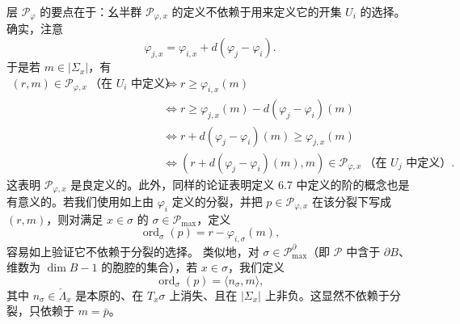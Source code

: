 层 $\mathcal{P}_\varphi$ 的要点在于：幺半群 $\mathcal{P}_{\varphi,x}$ 的定义不依赖于用来定义它的开集 $U_i$ 的选择。确实，注意
\[
\varphi_{j,x}=\varphi_{i,x}+d(\varphi_j-\varphi_i).
\]
于是若 $m\in|\Sigma_x|$，有
\begin{align*}
(r,m)\in\mathcal{P}_{\varphi,x}\ \text{（在 }U_i\text{ 中定义）}
&\iff r\ge\varphi_{i,x}(m)\\
&\iff r\ge\varphi_{j,x}(m)-d(\varphi_j-\varphi_i)(m)\\
&\iff r+d(\varphi_j-\varphi_i)(m)\ge\varphi_{j,x}(m)\\
&\iff (r+d(\varphi_j-\varphi_i)(m),m)\in\mathcal{P}_{\varphi,x}\ \text{（在 }U_j\text{ 中定义）}.
\end{align*}
这表明 $\mathcal{P}_{\varphi,x}$ 是良定义的。此外，同样的论证表明定义 6.7 中定义的阶的概念也是有意义的。若我们使用如上由 $\varphi_i$ 定义的分裂，并把 $p\in\mathcal{P}_{\varphi,x}$ 在该分裂下写成 $(r,m)$，则对满足 $x\in\sigma$ 的 $\sigma\in\mathcal{P}_{\max}$，定义
\[
\operatorname{ord}_\sigma(p)=r-\varphi_{i,\sigma}(m),
\]
容易如上验证它不依赖于分裂的选择。
类似地，对 $\sigma\in\mathcal{P}^\partial_{\max}$（即 $\mathcal{P}$ 中含于 $\partial B$、维数为 $\dim B-1$ 的胞腔的集合），若 $x\in\sigma$，我们定义
\[
\operatorname{ord}_\sigma(p)=\langle n_\sigma,m\rangle,
\]
其中 $n_\sigma\in\check\Lambda_x$ 是本原的、在 $T_x\sigma$ 上消失、且在 $|\Sigma_x|$ 上非负。这显然不依赖于分裂，只依赖于 $m=\bar p$。


